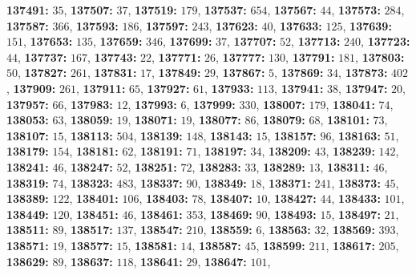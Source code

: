 \textsf{\bfseries 137491:} $35$, \textsf{\bfseries 137507:} $37$, \textsf{\bfseries 137519:} $179$, \textsf{\bfseries 137537:} $654$, \textsf{\bfseries 137567:} $44$, \textsf{\bfseries 137573:} $284$, \textsf{\bfseries 137587:} $366$, \textsf{\bfseries 137593:} $186$, \textsf{\bfseries 137597:} $243$, \textsf{\bfseries 137623:} $40$, \textsf{\bfseries 137633:} $125$, \textsf{\bfseries 137639:} $151$, \textsf{\bfseries 137653:} $135$, \textsf{\bfseries 137659:} $346$, \textsf{\bfseries 137699:} $37$, \textsf{\bfseries 137707:} $52$, \textsf{\bfseries 137713:} $240$, \textsf{\bfseries 137723:} $44$, \textsf{\bfseries 137737:} $167$, \textsf{\bfseries 137743:} $22$, \textsf{\bfseries 137771:} $26$, \textsf{\bfseries 137777:} $130$, \textsf{\bfseries 137791:} $181$, \textsf{\bfseries 137803:} $50$, \textsf{\bfseries 137827:} $261$, \textsf{\bfseries 137831:} $17$, \textsf{\bfseries 137849:} $29$, \textsf{\bfseries 137867:} $5$, \textsf{\bfseries 137869:} $34$, \textsf{\bfseries 137873:} $402$, \textsf{\bfseries 137909:} $261$, \textsf{\bfseries 137911:} $65$, \textsf{\bfseries 137927:} $61$, \textsf{\bfseries 137933:} $113$, \textsf{\bfseries 137941:} $38$, \textsf{\bfseries 137947:} $20$, \textsf{\bfseries 137957:} $66$, \textsf{\bfseries 137983:} $12$, \textsf{\bfseries 137993:} $6$, \textsf{\bfseries 137999:} $330$, \textsf{\bfseries 138007:} $179$, \textsf{\bfseries 138041:} $74$, \textsf{\bfseries 138053:} $63$, \textsf{\bfseries 138059:} $19$, \textsf{\bfseries 138071:} $19$, \textsf{\bfseries 138077:} $86$, \textsf{\bfseries 138079:} $68$, \textsf{\bfseries 138101:} $73$, \textsf{\bfseries 138107:} $15$, \textsf{\bfseries 138113:} $504$, \textsf{\bfseries 138139:} $148$, \textsf{\bfseries 138143:} $15$, \textsf{\bfseries 138157:} $96$, \textsf{\bfseries 138163:} $51$, \textsf{\bfseries 138179:} $154$, \textsf{\bfseries 138181:} $62$, \textsf{\bfseries 138191:} $71$, \textsf{\bfseries 138197:} $34$, \textsf{\bfseries 138209:} $43$, \textsf{\bfseries 138239:} $142$, \textsf{\bfseries 138241:} $46$, \textsf{\bfseries 138247:} $52$, \textsf{\bfseries 138251:} $72$, \textsf{\bfseries 138283:} $33$, \textsf{\bfseries 138289:} $13$, \textsf{\bfseries 138311:} $46$, \textsf{\bfseries 138319:} $74$, \textsf{\bfseries 138323:} $483$, \textsf{\bfseries 138337:} $90$, \textsf{\bfseries 138349:} $18$, \textsf{\bfseries 138371:} $241$, \textsf{\bfseries 138373:} $45$, \textsf{\bfseries 138389:} $122$, \textsf{\bfseries 138401:} $106$, \textsf{\bfseries 138403:} $78$, \textsf{\bfseries 138407:} $10$, \textsf{\bfseries 138427:} $44$, \textsf{\bfseries 138433:} $101$, \textsf{\bfseries 138449:} $120$, \textsf{\bfseries 138451:} $46$, \textsf{\bfseries 138461:} $353$, \textsf{\bfseries 138469:} $90$, \textsf{\bfseries 138493:} $15$, \textsf{\bfseries 138497:} $21$, \textsf{\bfseries 138511:} $89$, \textsf{\bfseries 138517:} $137$, \textsf{\bfseries 138547:} $210$, \textsf{\bfseries 138559:} $6$, \textsf{\bfseries 138563:} $32$, \textsf{\bfseries 138569:} $393$, \textsf{\bfseries 138571:} $19$, \textsf{\bfseries 138577:} $15$, \textsf{\bfseries 138581:} $14$, \textsf{\bfseries 138587:} $45$, \textsf{\bfseries 138599:} $211$, \textsf{\bfseries 138617:} $205$, \textsf{\bfseries 138629:} $89$, \textsf{\bfseries 138637:} $118$, \textsf{\bfseries 138641:} $29$, \textsf{\bfseries 138647:} $101$, 
